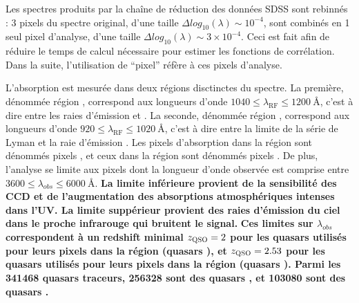 \documentclass[11pt, twoside, a4paper, openright]{report}
\begin{document}
Les spectres produits par la chaîne de réduction des données SDSS sont rebinnés : 3 pixels du spectre original, d'une taille $\Delta log_{10}(\lambda) \sim 10^{-4}$, sont combinés en 1 seul pixel d'analyse, d'une taille $\Delta log_{10}(\lambda) \sim 3 \times 10^{-4}$. Ceci est fait afin de réduire le temps de calcul nécessaire pour estimer les fonctions de corrélation. Dans la suite, l'utilisation de ``pixel'' réfère à ces pixels d'analyse.

L'absorption \lya{} est mesurée dans deux régions disctinctes du spectre. La première, dénommée région \lya{}, correspond aux longueurs d'onde $\num{1040} \leq \lambda_{\mathrm{RF}} \leq \SI{1200}{\angstrom}$, c'est à dire entre les raies d'émission \lyb{} et \lya{}. La seconde, dénommée région \lyb{}, correspond aux longueurs d'onde $\num{920} \leq \lambda_{\mathrm{RF}} \leq \SI{1020}{\angstrom}$, c'est à dire entre la limite de la série de Lyman et la raie d'émission \lyb{}. Les pixels d'absorption \lya{} dans la région \lya{} sont dénommés pixels \lyalya{}, et ceux dans la région \lyb{} sont dénommés pixels \lyalyb{}.
De plus, l'analyse se limite aux pixels dont la longueur d'onde observée est comprise entre $\num{3600} \leq \lambda_{obs} \leq \SI{6000}{\angstrom}$.
\textbf{La limite inférieure provient de la sensibilité des CCD et de l'augmentation des absorptions atmosphériques intenses dans l'UV. La limite suppérieur provient des raies d'émission du ciel dans le proche infrarouge qui bruitent le signal.}
\textbf{Ces limites sur $\lambda_{obs}$ correspondent à un redshift minimal $z_{\textsc{QSO}} = 2$ pour les quasars utilisés pour leurs pixels dans la région \lya{} (quasars \lya{}), et $z_{\textsc{QSO}} = 2.53$ pour les quasars utilisés pour leurs pixels dans la région \lyb{} (quasars \lyb{}). Parmi les \num{341468} quasars traceurs, \num{256328} sont des quasars \lya{}, et \num{103080} sont des quasars \lyb{}.}
\end{document}
